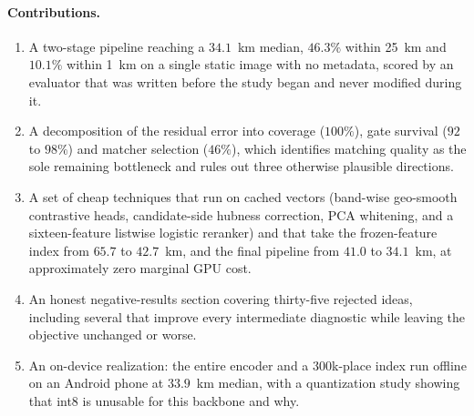 \documentclass[11pt,a4paper]{article}
\begin{document}
\paragraph{Contributions.}
\begin{enumerate}
\itemsep0.15em
\item A two-stage pipeline reaching a $34.1$~km median, $46.3\%$ within 25~km and $10.1\%$
within 1~km on a single static image with no metadata, scored by an evaluator that was
written before the study began and never modified during it.
\item A decomposition of the residual error into coverage ($100\%$), gate survival ($92$ to
$98\%$) and matcher selection ($46\%$), which identifies matching quality as the sole
remaining bottleneck and rules out three otherwise plausible directions.
\item A set of cheap techniques that run on cached vectors (band-wise geo-smooth
contrastive heads, candidate-side hubness correction, PCA whitening, and a sixteen-feature
listwise logistic reranker) and that take the frozen-feature index from $65.7$ to
$42.7$~km, and the final pipeline from $41.0$ to $34.1$~km, at approximately zero marginal
GPU cost.
\item An honest negative-results section covering thirty-five rejected ideas, including
several that improve every intermediate diagnostic while leaving the objective unchanged or
worse.
\item An on-device realization: the entire encoder and a $300$k-place index run offline on
an Android phone at $33.9$~km median, with a quantization study showing that int8 is
unusable for this backbone and why.
\end{enumerate}
\end{document}
